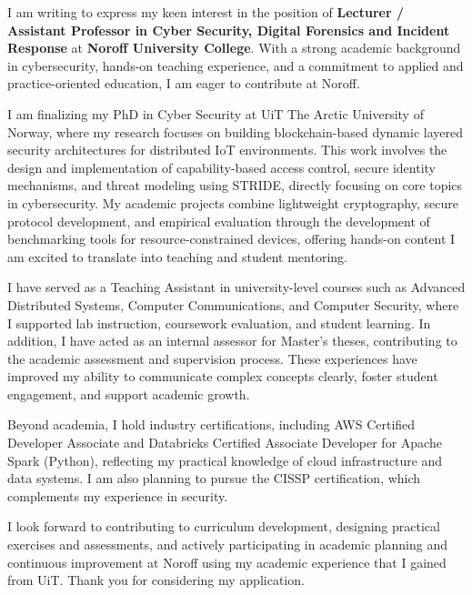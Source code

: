 I am writing to express my keen interest in the position of \textbf{Lecturer / Assistant Professor in Cyber Security, Digital Forensics and Incident Response} at \textbf{Noroff University College}. With a strong academic background in cybersecurity, hands-on teaching experience, and a commitment to applied and practice-oriented education, I am eager to contribute at Noroff.

I am finalizing my PhD in Cyber Security at UiT The Arctic University of Norway, where my research focuses on building blockchain-based dynamic layered security architectures for distributed IoT environments. This work involves the design and implementation of capability-based access control, secure identity mechanisms, and threat modeling using STRIDE, directly focusing on core topics in cybersecurity. My academic projects combine lightweight cryptography, secure protocol development, and empirical evaluation through the development of benchmarking tools for resource-constrained devices, offering hands-on content I am excited to translate into teaching and student mentoring.

I have served as a Teaching Assistant in university-level courses such as Advanced Distributed Systems, Computer Communications, and Computer Security, where I supported lab instruction, coursework evaluation, and student learning. In addition, I have acted as an internal assessor for Master’s theses, contributing to the academic assessment and supervision process. These experiences have improved my ability to communicate complex concepts clearly, foster student engagement, and support academic growth.

Beyond academia, I hold industry certifications, including AWS Certified Developer Associate and Databricks Certified Associate Developer for Apache Spark (Python), reflecting my practical knowledge of cloud infrastructure and data systems. I am also planning to pursue the CISSP certification, which complements my experience in security.

I look forward to contributing to curriculum development, designing practical exercises and assessments, and actively participating in academic planning and continuous improvement at Noroff using my academic experience that I gained from UiT. Thank you for considering my application.
